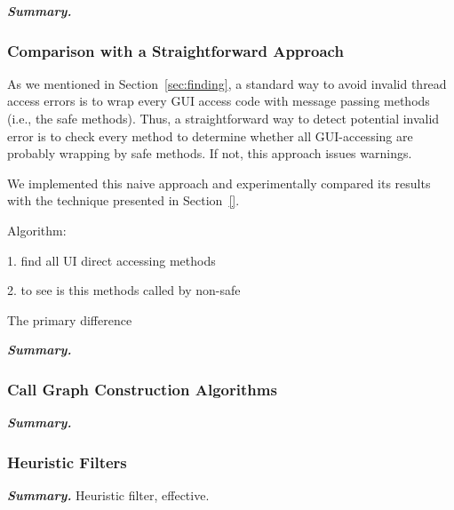 \vspace{1mm}

\noindent \textbf{\textit{Summary.}}

\subsubsection{Comparison with a Straightforward Approach}
\label{sec:straightforward}

As we mentioned in Section~\ref{sec:finding}, a standard way to avoid
invalid thread access errors is to wrap every GUI access code
with message passing methods (i.e., the safe methods). Thus, a
straightforward way to detect potential invalid error
is to check every method to determine whether all GUI-accessing
are probably wrapping by safe methods. If not, this
approach issues warnings.

We implemented this naive approach and experimentally compared its
results with the technique presented in Section~\ref{}.

Algorithm:

1. find all UI direct accessing methods 

2. to see is this methods called by non-safe

The primary difference



\vspace{1mm}

\noindent \textbf{\textit{Summary.}}

\subsubsection{Call Graph Construction Algorithms}
\label{sec:reflectionaware}

\vspace{1mm}

\noindent \textbf{\textit{Summary.}}

\subsubsection{Heuristic Filters}
\label{sec:filters}

\vspace{1mm}

\noindent \textbf{\textit{Summary.}}
Heuristic filter, effective.

